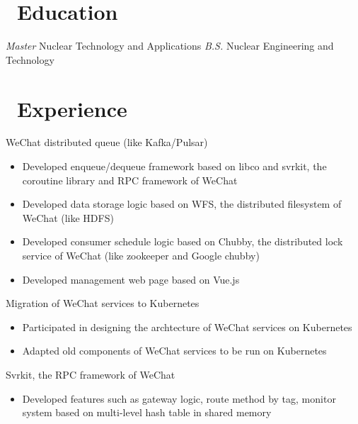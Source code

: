 \documentclass{resume}
\begin{document}



\section{\faGraduationCap\ Education}
\textit{Master} Nuclear Technology and Applications 
\textit{B.S.} Nuclear Engineering and Technology

\section{\faUsers\ Experience}

WeChat distributed queue (like Kafka/Pulsar)
\begin{itemize}
  \item Developed enqueue/dequeue framework based on libco and svrkit, the coroutine library and RPC framework of WeChat
  \item Developed data storage logic based on WFS, the distributed filesystem of WeChat (like HDFS)
  \item Developed consumer schedule logic based on Chubby, the distributed lock service of WeChat (like zookeeper and Google chubby)
  \item Developed management web page based on Vue.js
\end{itemize}

Migration of WeChat services to Kubernetes
\begin{itemize}
  \item Participated in designing the archtecture of WeChat services on Kubernetes
  \item Adapted old components of WeChat services to be run on Kubernetes
\end{itemize}

Svrkit, the RPC framework of WeChat
\begin{itemize}
  \item Developed features such as gateway logic, route method by tag, monitor system based on multi-level hash table in shared memory
\end{itemize}
\end{document}
